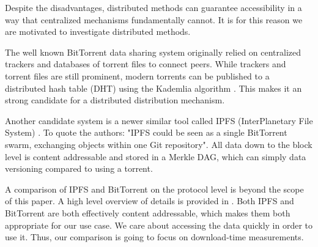 \documentclass[10pt,twocolumn,letterpaper]{article}
\begin{document}
Despite the disadvantages, distributed methods can guarantee accessibility in a
way that centralized mechanisms fundamentally cannot.  It is for this reason we
are motivated to investigate distributed methods.

The well known BitTorrent \cite{cohen_bittorrent_2017} data sharing system
originally relied on centralized trackers and databases of torrent files to
connect peers.  While trackers and torrent files are still prominent, modern
torrents can be published to a distributed hash table (DHT) using the Kademlia
algorithm \cite{maymounkov_kademlia_2002}. This makes it an strong candidate
for a distributed distribution mechanism. 

Another candidate system is a newer similar tool called IPFS (InterPlanetary
File System) \cite{benet_ipfs_2014, bieri_overview_2021}. To quote the authors:
"IPFS could be seen as a single BitTorrent swarm, exchanging objects within one
Git repository". All data down to the block level is content addressable and
stored in a Merkle DAG, which can simply data versioning compared to using a
torrent.


A comparison of IPFS and BitTorrent on the protocol level is beyond the scope
of this paper. A high level overview of details is provided in
\cite{zebedee_comparing_2023}.  Both IPFS and BitTorrent are both effectively
content addressable, which makes them both appropriate for our use case. We
care about accessing the data quickly in order to use it.  Thus, our comparison
is going to focus on download-time measurements.

\end{document}

